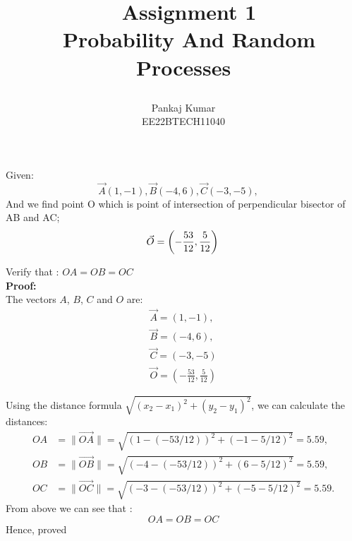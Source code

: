 \documentclass{article}
\newcommand{\pointA}{(1, -1)}
\newcommand{\pointB}{(-4, 6)}
\newcommand{\pointC}{(-3, -5)}
\begin{document}
\title{
\Huge \ Assignment 1\\
\Huge\ Probability And Random Processes\\
\large\author{Pankaj Kumar \\EE22BTECH11040}
}
\maketitle

Given:
\[
\vec{A}\pointA, \vec{B}\pointB, \vec{C}\pointC, \quad 
\]
And we find point O which is point of intersection of perpendicular bisector of AB and AC;\\
\[\vec{O} = \left(-\frac{53}{12}, \frac{5}{12}\right)\\\]


Verify that : $OA = OB = OC$\\

\textbf{Proof:}\\


The vectors $A$, $B$, $C$ and $O$ are:
\[
\begin{aligned}
\vec{A} = (1, -1), \\
\vec{B} = (-4, 6), \\
\vec{C} = (-3, -5)\\
\vec{O} = \left(-\frac{53}{12}, \frac{5}{12}\right)
\end{aligned}
\]

Using the distance formula $\sqrt{(x_2 - x_1)^2 + (y_2 - y_1)^2}$, we can calculate the distances:\\

\[
\begin{aligned}
OA &= \|\vec{OA}\| = \sqrt{(1 - (-53/12))^2 + (-1 - 5/12)^2}  =  5.59, \\
OB &= \|\vec{OB}\| = \sqrt{(-4 - (-53/12))^2 + (6 - 5/12)^2}  =  5.59, \\
OC &= \|\vec{OC}\| = \sqrt{(-3 - (-53/12))^2 + (-5 - 5/12)^2}  =  5.59.
\end{aligned}
\]
From above we can see that :\\
\[OA = OB = OC\]
\large Hence, proved
\end{document}
